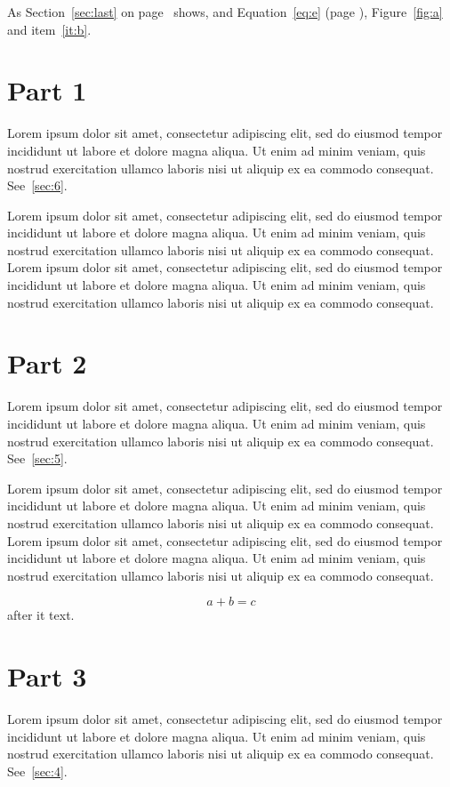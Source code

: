 \documentclass{article}
\begin{document}
As Section~\ref{sec:last} on page~\pageref{sec:last} shows, and Equation~\ref{eq:e} (page \pageref{eq:e}), Figure~\ref{fig:a} and item~\ref{it:b}.

\section{Part 1}\label{sec:1}
Lorem ipsum dolor sit amet, consectetur adipiscing elit, sed do eiusmod tempor incididunt ut labore et dolore magna aliqua. Ut enim ad minim veniam, quis nostrud exercitation ullamco laboris nisi ut aliquip ex ea commodo consequat. See~\ref{sec:6}.

Lorem ipsum dolor sit amet, consectetur adipiscing elit, sed do eiusmod tempor incididunt ut labore et dolore magna aliqua. Ut enim ad minim veniam, quis nostrud exercitation ullamco laboris nisi ut aliquip ex ea commodo consequat. Lorem ipsum dolor sit amet, consectetur adipiscing elit, sed do eiusmod tempor incididunt ut labore et dolore magna aliqua. Ut enim ad minim veniam, quis nostrud exercitation ullamco laboris nisi ut aliquip ex ea commodo consequat.

\section{Part 2}\label{sec:2}
Lorem ipsum dolor sit amet, consectetur adipiscing elit, sed do eiusmod tempor incididunt ut labore et dolore magna aliqua. Ut enim ad minim veniam, quis nostrud exercitation ullamco laboris nisi ut aliquip ex ea commodo consequat. See~\ref{sec:5}.

Lorem ipsum dolor sit amet, consectetur adipiscing elit, sed do eiusmod tempor incididunt ut labore et dolore magna aliqua. Ut enim ad minim veniam, quis nostrud exercitation ullamco laboris nisi ut aliquip ex ea commodo consequat. Lorem ipsum dolor sit amet, consectetur adipiscing elit, sed do eiusmod tempor incididunt ut labore et dolore magna aliqua. Ut enim ad minim veniam, quis nostrud exercitation ullamco laboris nisi ut aliquip ex ea commodo consequat.

\begin{equation}
a+b=c\label{eq:e}
\end{equation}
after it\label{after} text.

\section{Part 3}\label{sec:3}
Lorem ipsum dolor sit amet, consectetur adipiscing elit, sed do eiusmod tempor incididunt ut labore et dolore magna aliqua. Ut enim ad minim veniam, quis nostrud exercitation ullamco laboris nisi ut aliquip ex ea commodo consequat. See~\ref{sec:4}.
\end{document}
